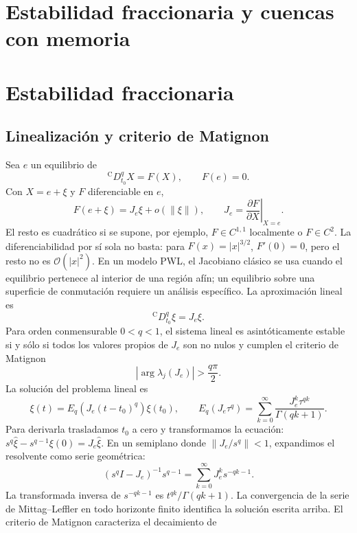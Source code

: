 \ifdefined\HAFOFractionalBlockStability
\ifdefined\HAFOFractionalBlockOperators\else
\ifHAFOBasinMaterial
\section{Estabilidad fraccionaria y cuencas con memoria}
\else
\section{Estabilidad fraccionaria}
\fi
\label{sec:fundamentos-estabilidad}
\fi
\subsection{Linealización y criterio de Matignon}

Sea \(e\) un equilibrio de
\[
{}^{\mathrm C}D_{t_0}^{q}X=F(X),\qquad F(e)=0.
\]
Con \(X=e+\xi\) y \(F\) diferenciable en \(e\),
\[
F(e+\xi)=J_e\xi+o(\|\xi\|),
\qquad
J_e=\left.\frac{\partial F}{\partial X}\right|_{X=e}.
\]
El resto es cuadrático si se supone, por ejemplo, \(F\in C^{1,1}\) localmente
o \(F\in C^2\). La diferenciabilidad por sí sola no basta: para
\(F(x)=|x|^{3/2}\), \(F'(0)=0\), pero el resto no es
\(\mathcal O(|x|^2)\). En un modelo PWL, el Jacobiano clásico se usa cuando el
equilibrio pertenece al interior de una región afín; un equilibrio sobre una
superficie de conmutación requiere un análisis específico.
La aproximación lineal es
\begin{equation}
{}^{\mathrm C}D_{t_0}^{q}\xi=J_e\xi.
\label{eq:lineal_caputo}
\end{equation}
Para orden conmensurable \(0<q<1\), el sistema lineal es asintóticamente
estable si y sólo si todos los valores propios de \(J_e\) son no nulos y
cumplen el criterio de Matignon \cite{Matignon1996}
\begin{equation}
|\arg\lambda_j(J_e)|>\frac{q\pi}{2}.
\label{eq:matignon}
\end{equation}
La solución del problema lineal es
\[
 \xi(t)=E_q\!\left(J_e(t-t_0)^q\right)\xi(t_0),
 \qquad
 E_q(J_e\tau^q)=\sum_{k=0}^{\infty}
 \frac{J_e^k\tau^{qk}}{\Gamma(qk+1)}.
\]
Para derivarla trasladamos \(t_0\) a cero y transformamos la ecuación:
\(s^q\widehat\xi-s^{q-1}\xi(0)=J_e\widehat\xi\). En un semiplano
donde \(\|J_e/s^q\|<1\), expandimos el resolvente como serie geométrica:
\[
 (s^qI-J_e)^{-1}s^{q-1}
 =\sum_{k=0}^{\infty}J_e^ks^{-qk-1}.
\]
La transformada inversa de \(s^{-qk-1}\) es
\(t^{qk}/\Gamma(qk+1)\). La convergencia de la serie de
Mittag--Leffler en todo horizonte finito identifica la solución escrita arriba. El criterio de Matignon caracteriza el decaimiento de
